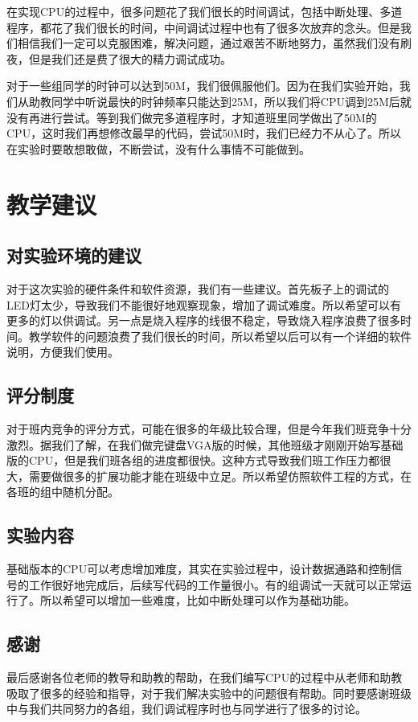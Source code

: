 在实现CPU的过程中，很多问题花了我们很长的时间调试，包括中断处理、多道程序，都花了我们很长的时间，中间调试过程中也有了很多次放弃的念头。但是我们相信我们一定可以克服困难，解决问题，通过艰苦不断地努力，虽然我们没有刷夜，但是我们还是费了很大的精力调试成功。

对于一些组同学的时钟可以达到50M，我们很佩服他们。因为在我们实验开始，我们从助教同学中听说最快的时钟频率只能达到25M，所以我们将CPU调到25M后就没有再进行尝试。等到我们做完多道程序时，才知道班里同学做出了50M的CPU，这时我们再想修改最早的代码，尝试50M时，我们已经力不从心了。所以在实验时要敢想敢做，不断尝试，没有什么事情不可能做到。




\section{教学建议}


\subsection{对实验环境的建议}

对于这次实验的硬件条件和软件资源，我们有一些建议。首先板子上的调试的LED灯太少，导致我们不能很好地观察现象，增加了调试难度。所以希望可以有更多的灯以供调试。另一点是烧入程序的线很不稳定，导致烧入程序浪费了很多时间。教学软件的问题浪费了我们很长的时间，所以希望以后可以有一个详细的软件说明，方便我们使用。

\subsection{评分制度}

对于班内竞争的评分方式，可能在很多的年级比较合理，但是今年我们班竞争十分激烈。据我们了解，在我们做完键盘VGA版的时候，其他班级才刚刚开始写基础版的CPU，但是我们班各组的进度都很快。这种方式导致我们班工作压力都很大，需要做很多的扩展功能才能在班级中立足。所以希望仿照软件工程的方式，在各班的组中随机分配。

\subsection{实验内容}

基础版本的CPU可以考虑增加难度，其实在实验过程中，设计数据通路和控制信号的工作很好地完成后，后续写代码的工作量很小。有的组调试一天就可以正常运行了。所以希望可以增加一些难度，比如中断处理可以作为基础功能。

\subsection{感谢}

最后感谢各位老师的教导和助教的帮助，在我们编写CPU的过程中从老师和助教吸取了很多的经验和指导，对于我们解决实验中的问题很有帮助。同时要感谢班级中与我们共同努力的各组，我们调试程序时也与同学进行了很多的讨论。


